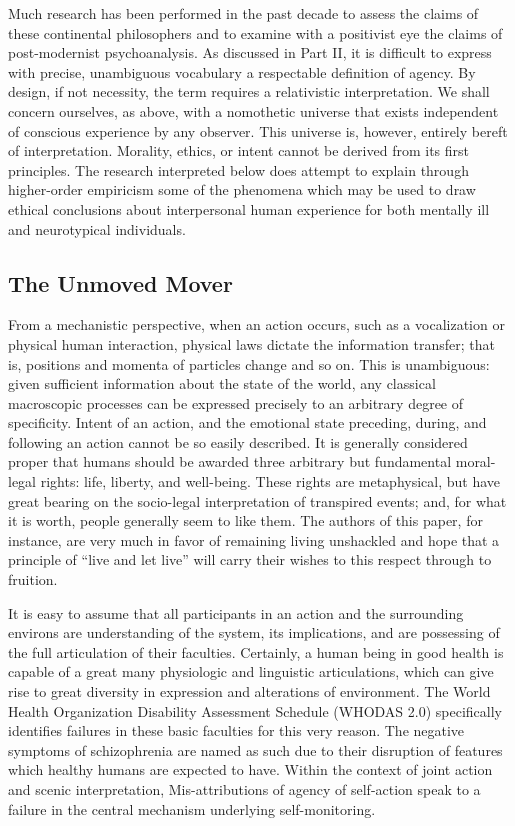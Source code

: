 \documentclass[]{article}
\begin{document}
	Much research has been performed in the past decade to assess the claims of these continental philosophers and to examine with a positivist eye the claims of post-modernist psychoanalysis. As discussed in Part II, it is difficult to express with precise, unambiguous vocabulary a respectable definition of agency. By design, if not necessity, the term requires a relativistic interpretation. We shall concern ourselves, as above, with a nomothetic universe that exists independent of conscious experience by any observer. This universe is, however, entirely bereft of interpretation. Morality, ethics, or intent cannot be derived from its first principles. The research interpreted below does attempt to explain through higher-order empiricism some of the phenomena which may be used to draw ethical conclusions about interpersonal human experience for both mentally ill and neurotypical individuals.
	
	\subsection{The Unmoved Mover}
	
		From a mechanistic perspective, when an action occurs, such as a vocalization or physical human interaction, physical laws dictate the information transfer; that is, positions and momenta of particles change and so on. This is unambiguous: given sufficient information about the state of the world, any classical macroscopic processes can be expressed precisely to an arbitrary degree of specificity. Intent of an action, and the emotional state preceding, during, and following an action cannot be so easily described. It is generally considered proper that humans should be awarded three arbitrary but fundamental moral-legal rights: life, liberty, and well-being. These rights are metaphysical, but have great bearing on the socio-legal interpretation of transpired events; and, for what it is worth, people generally seem to like them. The authors of this paper, for instance, are very much in favor of remaining living unshackled and hope that a principle of “live and let live” will carry their wishes to this respect through to fruition.
		
		It is easy to assume that all participants in an action and the surrounding environs are understanding of the system, its implications, and are possessing of the full articulation of their faculties. Certainly, a human being in good health is capable of a great many physiologic and linguistic articulations, which can give rise to great diversity in expression and alterations of environment. The World Health Organization Disability Assessment Schedule (WHODAS 2.0) specifically identifies failures in these basic faculties for this very reason. The negative symptoms of schizophrenia are named as such due to their disruption of features which healthy humans are expected to have.  Within the context of joint action and scenic interpretation, Mis-attributions of agency of self-action speak to a failure in the central mechanism underlying self-monitoring.
		
\end{document}
